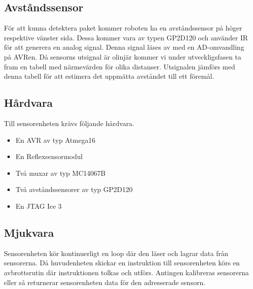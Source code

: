 \subsection{Avståndssensor}
För att kunna detektera paket kommer roboten ha en avståndssensor på höger respektive vänster sida. Dessa kommer vara av typen GP2D120 och använder IR för att generera en analog signal. Denna signal läses av med en AD-omvandling på AVRen. Då sensorns utsignal är olinjär kommer vi under utveckligsfasen ta fram en tabell med närmevärden för olika distanser. Utsignalen jämförs med denna tabell för att estimera det uppmätta avståndet till ett föremål.

\subsection{Hårdvara}
Till sensorenheten krävs följande hårdvara.
\begin{itemize}
\item{En AVR av typ Atmega16}
\item{En Reflexsensormodul}
\item{Två muxar av typ MC14067B}
\item{Två avståndssensorer av typ GP2D120}
\item{En JTAG Ice 3}
\end{itemize}

\subsection{Mjukvara}
Sensorenheten kör kontinuerligt en loop där den läser och lagrar data från sensorerna. Då huvudenheten skickar en instruktion till sensorenheten körs en avbrottsrutin där instruktionen tolkas och utförs. Antingen kalibreras sensorerna eller så returnerar sensorenheten data för den adresserade sensorn.




%
